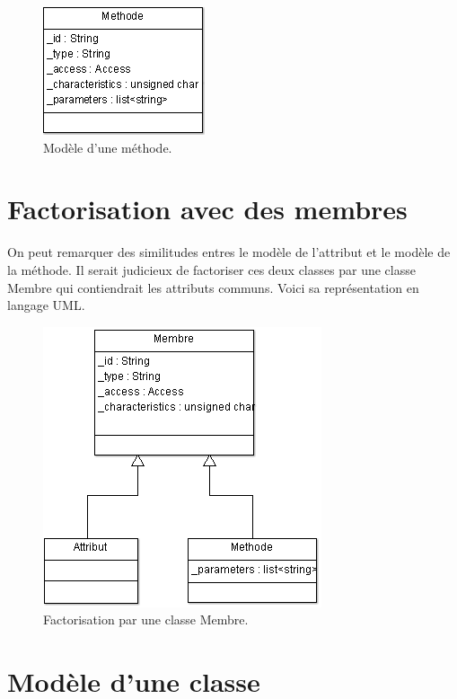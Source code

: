 \documentclass[a4paper,11pt]{report}
\begin{document}
\clearpage

\begin{figure}[!h]
   \begin{center}
   \includegraphics[scale = 1.0]{ModeleMethode.PNG}
   \end{center}
  \caption{Modèle d'une méthode.}
\end{figure}

\section{Factorisation avec des membres}

\normalsize{
On peut remarquer des similitudes entres le modèle de l'attribut et le modèle de la méthode. Il serait judicieux de factoriser ces deux classes par une classe Membre qui contiendrait les attributs communs. Voici sa représentation en langage UML.
}

\begin{figure}[!h]
   \begin{center}
   \includegraphics[scale = 0.9]{factorisationUML.PNG}
   \end{center}
  \caption{Factorisation par une classe Membre.}
\end{figure}


\section{Modèle d'une classe}
\end{document}
